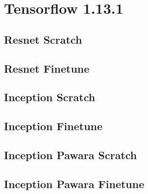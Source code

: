 \section{Tensorflow 1.13.1}

\subsection{Resnet Scratch}
\begin{figure}[H]

\end{figure}

\subsection{Resnet Finetune}
\begin{figure}[H]

\end{figure}

\newpage

\subsection{Inception Scratch}
\begin{figure}[H]

\end{figure}
\subsection{Inception Finetune}
\begin{figure}[H]

\end{figure}

\newpage

\subsection{Inception Pawara Scratch}
\begin{figure}[H]

\end{figure}

\subsection{Inception Pawara Finetune}
\begin{figure}[H]

\end{figure}




